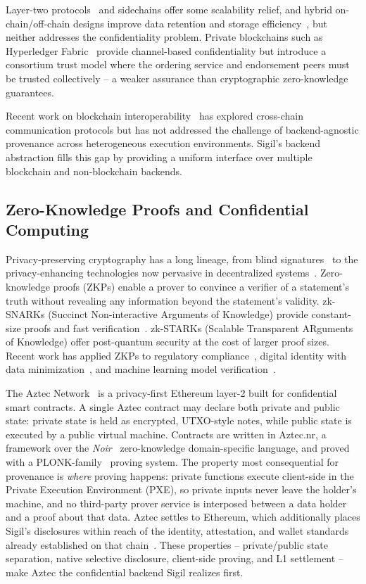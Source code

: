 \documentclass[conference]{IEEEtran}
\begin{document}
Layer-two protocols~\cite{gudgeon2020} and sidechains offer some scalability
relief, and hybrid on-chain/off-chain designs improve data retention and
storage efficiency~\cite{renner2023}, but neither addresses the confidentiality
problem.  Private blockchains
such as Hyperledger Fabric~\cite{androulaki2018} provide channel-based
confidentiality but introduce a consortium trust model where the ordering
service and endorsement peers must be trusted collectively -- a weaker
assurance than cryptographic zero-knowledge guarantees.

Recent work on blockchain interoperability~\cite{belchior2022} has explored
cross-chain communication protocols but has not addressed the challenge of
backend-agnostic provenance across heterogeneous execution environments.
Sigil's backend abstraction fills this gap by providing a uniform interface
over multiple blockchain and non-blockchain backends.

\subsection{Zero-Knowledge Proofs and Confidential Computing}

Privacy-preserving cryptography has a long lineage, from blind
signatures~\cite{chaum1982} to the privacy-enhancing technologies now pervasive
in decentralized systems~\cite{meiklejohn2024}.  Zero-knowledge proofs (ZKPs)
enable a prover to convince a verifier of a
statement's truth without revealing any information beyond the statement's
validity.  zk-SNARKs (Succinct Non-interactive Arguments of Knowledge) provide
constant-size proofs and fast verification~\cite{bunz2018,ben-sasson2021}.
zk-STARKs (Scalable Transparent ARguments of Knowledge) offer post-quantum
security at the cost of larger proof sizes.  Recent work has applied ZKPs to
regulatory compliance~\cite{gabay2023}, digital identity with data
minimization~\cite{babel2023}, and machine learning model
verification~\cite{zhang2024}.

The Aztec Network~\cite{aztec2023} is a privacy-first Ethereum layer-2 built
for confidential smart contracts.  A single Aztec contract may declare both
private and public state: private state is held as encrypted, UTXO-style notes,
while public state is executed by a public virtual machine.  Contracts are
written in Aztec.nr, a framework over the \emph{Noir}~\cite{noir2023}
zero-knowledge domain-specific language, and proved with a
PLONK-family~\cite{gabizon2019} proving system.  The property most consequential
for provenance is \emph{where} proving happens: private functions execute
client-side in the Private Execution Environment (PXE), so private inputs never
leave the holder's machine, and no third-party prover service is interposed
between a data holder and a proof about that data.  Aztec settles to Ethereum,
which additionally places Sigil's disclosures within reach of the identity,
attestation, and wallet standards already established on that
chain~\cite{buterin2014}.  These properties -- private/public state separation,
native selective disclosure, client-side proving, and L1 settlement -- make
Aztec the confidential backend Sigil realizes first.
\end{document}
